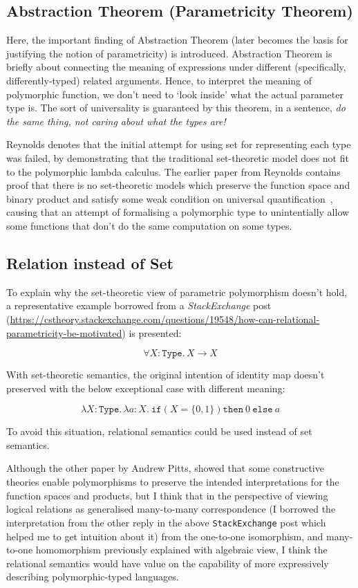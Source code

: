 \documentclass[sigconf]{acmart}
\begin{document}
\subsection{Abstraction Theorem (Parametricity Theorem)}

Here, the important finding of Abstraction Theorem (later becomes the basis for justifying the notion of parametricity) is introduced. Abstraction Theorem is briefly about connecting the meaning of expressions under different (specifically, differently-typed) related arguments. Hence, to interpret the meaning of polymorphic function, we don't need to `look inside' what the actual parameter type is. The sort of universality is guaranteed by this theorem, in a sentence, \textit{do the same thing, not caring about what the types are!}

Reynolds denotes that the initial attempt for using set for representing each type was failed, by demonstrating that the traditional set-theoretic model does not fit to the polymorphic lambda calculus. The earlier paper from Reynolds contains proof that there is no set-theoretic models which preserve the function space and binary product and satisfy some weak condition on universal quantification~\cite{nosettheoretic}, causing that an attempt of formalising a polymorphic type to unintentially allow some functions that don't do the same computation on some types. 

\subsection{Relation instead of Set}

To explain why the set-theoretic view of parametric polymorphism doesn't hold, a representative example borrowed from a \textit{StackExchange} post (\url{https://cstheory.stackexchange.com/questions/19548/how-can-relational-parametricity-be-motivated}) is presented:

\[\forall X : \texttt{Type.}\, X \rightarrow X \]

With set-theoretic semantics, the original intention of identity map doesn't preserved with the below exceptional case with different meaning:

\[\lambda X : \texttt{Type.}\, \lambda a : X.\: \texttt{if} \left( X = \{0, 1\} \right) \texttt{then} \: 0 \: \texttt{else} \: a \]

To avoid this situation, relational semantics could be used instead of set semantics. 


Although the other paper by Andrew Pitts, showed that some constructive theories enable polymorphisms to preserve the intended interpretations for the function spaces and products, but I think that in the perspective of viewing logical relations as generalised many-to-many correspondence (I borrowed the interpretation from the other reply in the above \texttt{StackExchange} post which helped me to get intuition about it) from the one-to-one isomorphism, and many-to-one homomorphism previously explained with algebraic view, I think the relational semantics would have value on the capability of more expressively describing polymorphic-typed languages.
\end{document}
